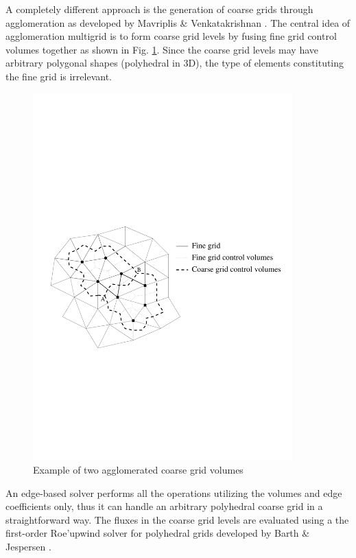  A completely different approach is the generation of coarse grids through
 agglomeration as developed by Mavriplis \& Venkatakrishnan
 \citeyear{Mavriplis:3,Mavriplis:8}. The central idea of agglomeration multigrid
 is to form coarse grid levels by fusing fine grid control volumes together
 as shown in Fig. \ref{agglo1.fig}. Since the coarse grid levels may have
 arbitrary polygonal shapes (polyhedral in 3D), the type of elements constituting
 the fine grid is irrelevant.

%
\begin{figure}[ht]
   \centerline{\includegraphics[width=100mm,clip=t]{APPEND/FIGURE/aggloc.pdf}}
   \caption{Example of two agglomerated coarse grid volumes}
   \label{agglo1.fig}
\end{figure}
%
 An edge-based solver performs all the operations utilizing the volumes and edge
 coefficients only, thus it can handle an arbitrary polyhedral coarse grid
 in a straightforward way. The fluxes in the coarse grid levels are evaluated
 using a the first-order Roe'upwind solver for polyhedral grids developed by
 Barth \& Jespersen \citeyear{Barth:1}.

